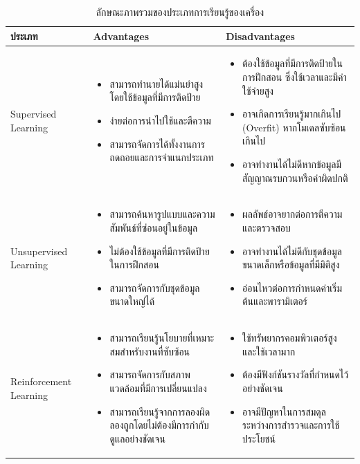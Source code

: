 \begin{table}[htbp]
\centering
\small
\setlength{\tabcolsep}{4pt}
\renewcommand{\arraystretch}{1.2}

\caption{ลักษณะภาพรวมของประเภทการเรียนรู้ของเครื่อง}
\label{tab:ml_types}

\begin{tabular}{p{3cm} p{6cm} p{6cm}}
\hline
\textbf{ประเภท} & \textbf{Advantages} & \textbf{Disadvantages} \\
\hline

Supervised Learning &
\begin{itemize}
\item สามารถทำนายได้แม่นยำสูงโดยใช้ข้อมูลที่มีการติดป้าย
\item ง่ายต่อการนำไปใช้และตีความ
\item สามารถจัดการได้ทั้งงานการถดถอยและการจำแนกประเภท
\end{itemize}
&
\begin{itemize}
\item ต้องใช้ข้อมูลที่มีการติดป้ายในการฝึกสอน ซึ่งใช้เวลาและมีค่าใช้จ่ายสูง
\item อาจเกิดการเรียนรู้มากเกินไป (Overfit) หากโมเดลซับซ้อนเกินไป
\item อาจทำงานได้ไม่ดีหากข้อมูลมีสัญญาณรบกวนหรือค่าผิดปกติ
\end{itemize}
\\

Unsupervised Learning &
\begin{itemize}
\item สามารถค้นหารูปแบบและความสัมพันธ์ที่ซ่อนอยู่ในข้อมูล
\item ไม่ต้องใช้ข้อมูลที่มีการติดป้ายในการฝึกสอน
\item สามารถจัดการกับชุดข้อมูลขนาดใหญ่ได้
\end{itemize}
&
\begin{itemize}
\item ผลลัพธ์อาจยากต่อการตีความและตรวจสอบ
\item อาจทำงานได้ไม่ดีกับชุดข้อมูลขนาดเล็กหรือข้อมูลที่มีมิติสูง
\item อ่อนไหวต่อการกำหนดค่าเริ่มต้นและพารามิเตอร์
\end{itemize}
\\

Reinforcement Learning &
\begin{itemize}
\item สามารถเรียนรู้นโยบายที่เหมาะสมสำหรับงานที่ซับซ้อน
\item สามารถจัดการกับสภาพแวดล้อมที่มีการเปลี่ยนแปลง
\item สามารถเรียนรู้จากการลองผิดลองถูกโดยไม่ต้องมีการกำกับดูแลอย่างชัดเจน
\end{itemize}
&
\begin{itemize}
\item ใช้ทรัพยากรคอมพิวเตอร์สูงและใช้เวลามาก
\item ต้องมีฟังก์ชันรางวัลที่กำหนดไว้อย่างชัดเจน
\item อาจมีปัญหาในการสมดุลระหว่างการสำรวจและการใช้ประโยชน์
\end{itemize}
\\

\hline
\end{tabular}
\end{table}

